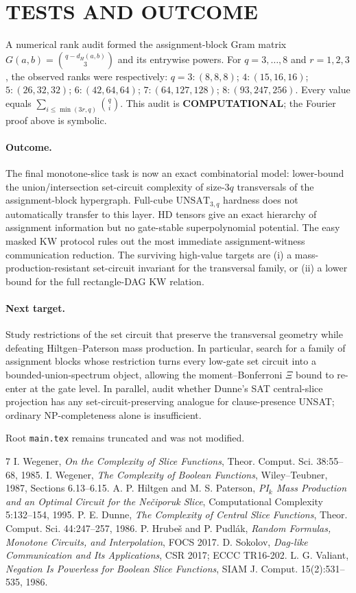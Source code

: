 \documentclass[11pt]{article}
\newcommand{\COMP}{\textbf{COMPUTATIONAL}}
\begin{document}
\section{TESTS AND OUTCOME}
A numerical rank audit formed the assignment-block Gram matrix $G(a,b)=\binom{q-d_H(a,b)}3$ and its entrywise powers. For $q=3,\ldots,8$ and $r=1,2,3$, the observed ranks were respectively: $q=3:(8,8,8)$; $4:(15,16,16)$; $5:(26,32,32)$; $6:(42,64,64)$; $7:(64,127,128)$; $8:(93,247,256)$. Every value equals $\sum_{i\le\min(3r,q)}\binom qi$. This audit is \COMP; the Fourier proof above is symbolic.

\paragraph{Outcome.}
The final monotone-slice task is now an exact combinatorial model: lower-bound the union/intersection set-circuit complexity of size-$3q$ transversals of the assignment-block hypergraph. Full-cube $\mathrm{UNSAT}_{3,q}$ hardness does not automatically transfer to this layer. HD tensors give an exact hierarchy of assignment information but no gate-stable superpolynomial potential. The easy masked KW protocol rules out the most immediate assignment-witness communication reduction. The surviving high-value targets are (i) a mass-production-resistant set-circuit invariant for the transversal family, or (ii) a lower bound for the full rectangle-DAG KW relation.

\paragraph{Next target.}
Study restrictions of the set circuit that preserve the transversal geometry while defeating Hiltgen--Paterson mass production. In particular, search for a family of assignment blocks whose restriction turns every low-gate set circuit into a bounded-union-spectrum object, allowing the moment--Bonferroni $\Xi$ bound to re-enter at the gate level. In parallel, audit whether Dunne's SAT central-slice projection has any set-circuit-preserving analogue for clause-presence UNSAT; ordinary NP-completeness alone is insufficient.

Root \texttt{main.tex} remains truncated and was not modified.

\begin{thebibliography}{7}
 I. Wegener, \emph{On the Complexity of Slice Functions}, Theor. Comput. Sci. 38:55--68, 1985.
 I. Wegener, \emph{The Complexity of Boolean Functions}, Wiley--Teubner, 1987, Sections 6.13--6.15.
 A. P. Hiltgen and M. S. Paterson, \emph{PI$_k$ Mass Production and an Optimal Circuit for the Ne\v{c}iporuk Slice}, Computational Complexity 5:132--154, 1995.
 P. E. Dunne, \emph{The Complexity of Central Slice Functions}, Theor. Comput. Sci. 44:247--257, 1986.
 P. Hrube\v{s} and P. Pudl\'ak, \emph{Random Formulas, Monotone Circuits, and Interpolation}, FOCS 2017.
 D. Sokolov, \emph{Dag-like Communication and Its Applications}, CSR 2017; ECCC TR16-202.
 L. G. Valiant, \emph{Negation Is Powerless for Boolean Slice Functions}, SIAM J. Comput. 15(2):531--535, 1986.
\end{thebibliography}
\end{document}
